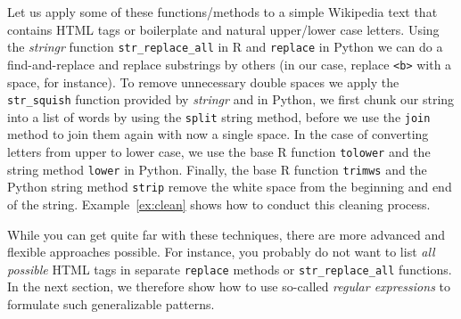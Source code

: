 Let us apply some of these functions/methods to a simple Wikipedia
text that contains HTML tags or boilerplate and natural upper/lower
case letters.
Using the \emph{stringr} function \texttt{str\_replace\_all} in R
and \texttt{replace} in Python we can do a find-and-replace and replace substrings
by others (in our case, replace \texttt{<b>} with a space, for instance).
To remove unnecessary double spaces we apply the \texttt{str\_squish} function provided by \emph{stringr} and in Python,
we first chunk our string into a list of words by using the \texttt{split} string method, before we use the \texttt{join} method
to join them again with now a single space.
In the case of converting letters from upper to lower case, we use the base R function \texttt{tolower} and the string
method \texttt{lower} in Python.
Finally, the base R function \texttt{trimws} and the
Python string method \texttt{strip} remove the white space from the beginning
and end of the string.
Example~\ref{ex:clean} shows how to conduct this cleaning process.

While you can get quite far with these techniques, there are more advanced and flexible approaches possible.
For instance, you probably do not want to list \emph{all possible} HTML tags in separate \texttt{replace} methods or \texttt{str\_replace\_all} functions. In the next section, we therefore show how to use so-called \emph{regular expressions} to formulate such generalizable patterns.




